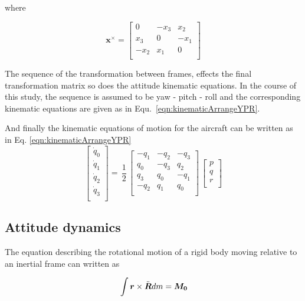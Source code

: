 where

\begin{equation}\label{skew_symmetric}
\bm{x} ^ \times= \begin{bmatrix} 
0 & -x_3 & x_2 \\
x_3 & 0 & -x_1 \\
-x_2 & x_1 & 0 \\
 \end{bmatrix}
\end{equation}

The sequence of the transformation between frames, effects the final transformation matrix so does the attitude kinematic equations. In the course of this study, the sequence is assumed to be yaw - pitch - roll and the corresponding kinematic equations are given as in Equ.~\ref{eqn:kinematicArrangeYPR}.

And finally the kinematic equations of motion for the aircraft can be written as in Eq. \ref{eqn:kinematicArrangeYPR}
\begin{equation} \label{eqn:kinematicArrangeYPR}
\begin{bmatrix}
\dot{q}_0\\[0.2em]
\dot{q}_1\\[0.2em]
\dot{q}_2\\[0.2em]
\dot{q}_3\\[0.2em]
\end{bmatrix}
 =\,
\frac{1}{2}
\,
\begin{bmatrix}
-q_1 & -q_2 & -q_3 \\
q_0 & -q_3 & q_2 \\
q_3 & q_0 & -q_1 \\
-q_2 & q_1 & q_0\\
\end{bmatrix}
\,
\begin{bmatrix}
p\\[0.2em]
q\\[0.2em]
r\\[0.2em]
\end{bmatrix} 
\end{equation}

\subsection{Attitude dynamics}

The equation describing the rotational motion of a rigid body moving relative to an inertial frame can written as \cite{wie2008space}

\begin{equation}{\label{eqn:kinematicEquDQM}}
\int \bm{r} \times \ddot{\bm{R}} dm = \bm{M_0}
\end{equation}

